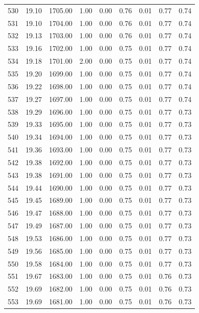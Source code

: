 \documentclass{article}\usepackage[]{graphicx}\usepackage[]{color}
\begin{document}
\begin{longtable}{rrrrrrrrr}
  530 & 19.10 & 1705.00 & 1.00 & 0.00 & 0.76 & 0.01 & 0.77 & 0.74 \\ 
  531 & 19.10 & 1704.00 & 1.00 & 0.00 & 0.76 & 0.01 & 0.77 & 0.74 \\ 
  532 & 19.13 & 1703.00 & 1.00 & 0.00 & 0.76 & 0.01 & 0.77 & 0.74 \\ 
  533 & 19.16 & 1702.00 & 1.00 & 0.00 & 0.75 & 0.01 & 0.77 & 0.74 \\ 
  534 & 19.18 & 1701.00 & 2.00 & 0.00 & 0.75 & 0.01 & 0.77 & 0.74 \\ 
  535 & 19.20 & 1699.00 & 1.00 & 0.00 & 0.75 & 0.01 & 0.77 & 0.74 \\ 
  536 & 19.22 & 1698.00 & 1.00 & 0.00 & 0.75 & 0.01 & 0.77 & 0.74 \\ 
  537 & 19.27 & 1697.00 & 1.00 & 0.00 & 0.75 & 0.01 & 0.77 & 0.74 \\ 
  538 & 19.29 & 1696.00 & 1.00 & 0.00 & 0.75 & 0.01 & 0.77 & 0.73 \\ 
  539 & 19.33 & 1695.00 & 1.00 & 0.00 & 0.75 & 0.01 & 0.77 & 0.73 \\ 
  540 & 19.34 & 1694.00 & 1.00 & 0.00 & 0.75 & 0.01 & 0.77 & 0.73 \\ 
  541 & 19.36 & 1693.00 & 1.00 & 0.00 & 0.75 & 0.01 & 0.77 & 0.73 \\ 
  542 & 19.38 & 1692.00 & 1.00 & 0.00 & 0.75 & 0.01 & 0.77 & 0.73 \\ 
  543 & 19.38 & 1691.00 & 1.00 & 0.00 & 0.75 & 0.01 & 0.77 & 0.73 \\ 
  544 & 19.44 & 1690.00 & 1.00 & 0.00 & 0.75 & 0.01 & 0.77 & 0.73 \\ 
  545 & 19.45 & 1689.00 & 1.00 & 0.00 & 0.75 & 0.01 & 0.77 & 0.73 \\ 
  546 & 19.47 & 1688.00 & 1.00 & 0.00 & 0.75 & 0.01 & 0.77 & 0.73 \\ 
  547 & 19.49 & 1687.00 & 1.00 & 0.00 & 0.75 & 0.01 & 0.77 & 0.73 \\ 
  548 & 19.53 & 1686.00 & 1.00 & 0.00 & 0.75 & 0.01 & 0.77 & 0.73 \\ 
  549 & 19.56 & 1685.00 & 1.00 & 0.00 & 0.75 & 0.01 & 0.77 & 0.73 \\ 
  550 & 19.58 & 1684.00 & 1.00 & 0.00 & 0.75 & 0.01 & 0.77 & 0.73 \\ 
  551 & 19.67 & 1683.00 & 1.00 & 0.00 & 0.75 & 0.01 & 0.76 & 0.73 \\ 
  552 & 19.69 & 1682.00 & 1.00 & 0.00 & 0.75 & 0.01 & 0.76 & 0.73 \\ 
  553 & 19.69 & 1681.00 & 1.00 & 0.00 & 0.75 & 0.01 & 0.76 & 0.73 \\ 

\end{longtable}
\end{document}
